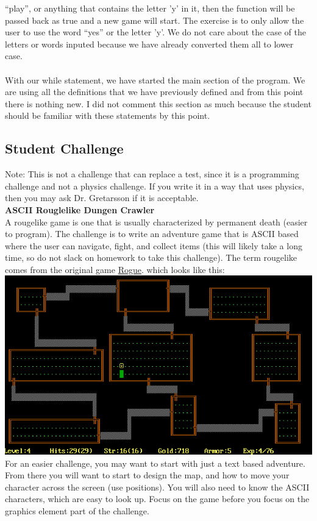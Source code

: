 \documentclass[11pt]{article}   %
\begin{document}
``play'', or anything that contains the letter 'y' in it, then the function will be passed back as true and a 
new game will start.  The exercise is to only allow the user to use the word ``yes'' or the letter 'y'.  We do 
not care about the case of the letters or words inputed because we have already converted them all to  lower case.
\\
\\
With our while statement, we have started the main section of the program.  We are using all the definitions that 
we have previously defined and from this point there is nothing new.  I did not comment this section as much
because the student should be familiar with these statements by this point.

\subsection*{Student Challenge}
Note: This is not a challenge that can replace a test, since it is a programming challenge and not a physics challenge.  If you write it in a way that uses physics, then you may ask Dr. Gretarsson if it is acceptable.
\\\textbf{ASCII Rouglelike Dungen Crawler}\\
A rougelike game is one that is usually characterized by permanent death (easier to program).  The challenge is to
write an adventure game that is ASCII based where the user can navigate, fight, and collect items (this will
likely take a long time, so do not slack on homework to take this challenge).  The term rougelike comes from the
original game \href{http://en.wikipedia.org/wiki/Rogue_(video_game)}{Rogue}. which looks like this:
\\
\includegraphics[scale=0.79]{Rogue.png}
\\
For an easier challenge, you may want to start with just a text based adventure.  From there you will want to 
start to design the map, and how to move your character across the screen (use positions).  You will also need to
know the ASCII characters, which are easy to look up.  Focus on the game before you focus on the graphics element
part of the challenge.
\end{document}
